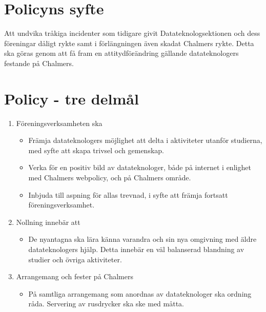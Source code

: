 \documentclass[a4paper, 10pt]{article}
\begin{document}
\section{Policyns syfte}
Att undvika tråkiga incidenter som tidigare givit Datateknologsektionen och dess föreningar dåligt rykte samt i förlängningen även skadat Chalmers rykte. Detta ska göras genom att få fram en attitydförändring gällande datateknologers festande på Chalmers.

\section{Policy - tre delmål}

\begin{enumerate}
\item Föreningsverksamheten ska
\begin{itemize}
\item Främja datateknologers möjlighet att delta i aktiviteter utanför studierna, med syfte att skapa trivsel och gemenskap.
\item Verka för en positiv bild av datateknologer, både på internet i enlighet med Chalmers webpolicy, och på Chalmers område.
\item Inbjuda till aspning för allas trevnad, i syfte att främja fortsatt föreningsverksamhet.
\end{itemize}

\item Nollning innebär att
\begin{itemize}
\item De nyantagna ska lära känna varandra och sin nya omgivning med äldre datateknologers hjälp. Detta innebär en väl balanserad blandning av studier och övriga aktiviteter.
\end{itemize}

\item Arrangemang och fester på Chalmers
\begin{itemize}
\item På samtliga arrangemang som anordnas av datateknologer ska ordning råda. Servering av rusdrycker ska ske med måtta.
\end{itemize}

\end{enumerate}
\end{document}
